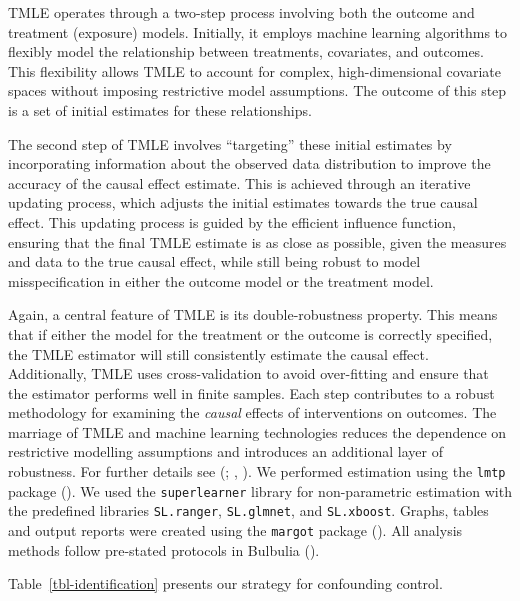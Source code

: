 \documentclass[
  single column]{article}
\begin{document}
TMLE operates through a two-step process involving both the outcome and
treatment (exposure) models. Initially, it employs machine learning
algorithms to flexibly model the relationship between treatments,
covariates, and outcomes. This flexibility allows TMLE to account for
complex, high-dimensional covariate spaces without imposing restrictive
model assumptions. The outcome of this step is a set of initial
estimates for these relationships.

The second step of TMLE involves ``targeting'' these initial estimates
by incorporating information about the observed data distribution to
improve the accuracy of the causal effect estimate. This is achieved
through an iterative updating process, which adjusts the initial
estimates towards the true causal effect. This updating process is
guided by the efficient influence function, ensuring that the final TMLE
estimate is as close as possible, given the measures and data to the
true causal effect, while still being robust to model misspecification
in either the outcome model or the treatment model.

Again, a central feature of TMLE is its double-robustness property. This
means that if either the model for the treatment or the outcome is
correctly specified, the TMLE estimator will still consistently estimate
the causal effect. Additionally, TMLE uses cross-validation to avoid
over-fitting and ensure that the estimator performs well in finite
samples. Each step contributes to a robust methodology for examining the
\emph{causal} effects of interventions on outcomes. The marriage of TMLE
and machine learning technologies reduces the dependence on restrictive
modelling assumptions and introduces an additional layer of robustness.
For further details see (; ,
). We performed estimation using the
\texttt{lmtp} package (). We used the \texttt{superlearner} library for non-parametric
estimation with the predefined libraries \texttt{SL.ranger},
\texttt{SL.glmnet}, and \texttt{SL.xboost}. Graphs, tables and output
reports were created using the \texttt{margot} package
(). All analysis methods follow
pre-stated protocols in Bulbulia
().

\newpage{}

Table~\ref{tbl-identification} presents our strategy for confounding
control.
\end{document}
